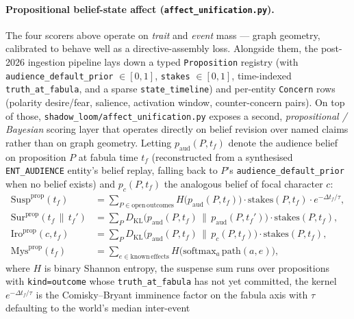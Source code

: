 \documentclass[11pt]{article}
\begin{document}
\paragraph{Propositional belief-state affect (\texttt{affect\_unification.py}).}
The four scorers above operate on \emph{trait} and \emph{event}
mass --- graph geometry, calibrated to behave well as a
directive-assembly loss. Alongside them, the post-2026 ingestion
pipeline lays down a typed \texttt{Proposition} registry (with
\texttt{audience\_default\_prior} $\in [0, 1]$,
\texttt{stakes} $\in [0, 1]$, time-indexed
\texttt{truth\_at\_fabula}, and a sparse \texttt{state\_timeline})
and per-entity \texttt{Concern} rows (polarity desire/fear,
salience, activation window, counter-concern pairs). On top of
those, \texttt{shadow\_loom/affect\_unification.py} exposes a
second, \emph{propositional / Bayesian} scoring layer that
operates directly on belief revision over named claims rather
than on graph geometry. Letting $p_{\mathrm{aud}}(P, t_f)$ denote
the audience belief on proposition $P$ at fabula time $t_f$
(reconstructed from a synthesised \texttt{ENT\_AUDIENCE} entity's
belief replay, falling back to $P$'s
\texttt{audience\_default\_prior} when no belief exists) and
$p_c(P, t_f)$ the analogous belief of focal character $c$:
\begin{align}
\label{eq:susp-prop}
\mathrm{Susp}^{\mathrm{prop}}(t_f) &= \!\!\!\sum_{P \in \mathrm{open\,outcomes}}\!\!\! H\!\big(p_{\mathrm{aud}}(P, t_f)\big) \cdot \mathrm{stakes}(P, t_f) \cdot e^{-\Delta t_f / \tau}, \\
\label{eq:sur-prop}
\mathrm{Sur}^{\mathrm{prop}}(t_f \,\|\, t_f') &= \sum_P D_{\mathrm{KL}}\!\big(p_{\mathrm{aud}}(P, t_f) \,\|\, p_{\mathrm{aud}}(P, t_f')\big) \cdot \mathrm{stakes}(P, t_f), \\
\label{eq:iro-prop}
\mathrm{Iro}^{\mathrm{prop}}(c, t_f) &= \sum_P D_{\mathrm{KL}}\!\big(p_{\mathrm{aud}}(P, t_f) \,\|\, p_c(P, t_f)\big) \cdot \mathrm{stakes}(P, t_f), \\
\label{eq:mys-prop}
\mathrm{Mys}^{\mathrm{prop}}(t_f) &= \!\!\!\sum_{e \in \mathrm{known\,effects}}\!\!\! H\!\big(\mathrm{softmax}_a \,\mathrm{path}(a, e)\big),
\end{align}
where $H$ is binary Shannon entropy, the suspense sum runs over
propositions with \texttt{kind=\textquotesingle outcome\textquotesingle}
whose \texttt{truth\_at\_fabula} has not yet committed, the kernel
$e^{-\Delta t_f/\tau}$ is the Comisky--Bryant imminence factor on the
fabula axis with $\tau$ defaulting to the world's median inter-event
\end{document}
